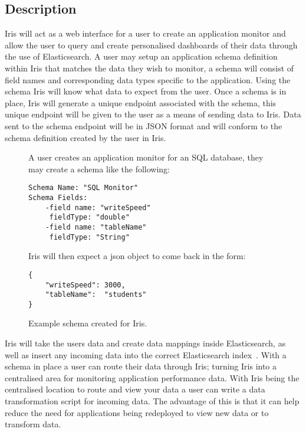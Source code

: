 \documentclass[12pt,a4paper,titlepage]{report}
\begin{document}
\subsection{Description}
Iris will act as a web interface for a user to create an application monitor and allow the user to query and create personalised dashboards of their data through the use of Elasticsearch. A user may setup an application schema definition within Iris that matches the data they wish to monitor, a schema will consist of field names and corresponding data types specific to the application. Using the schema Iris will know what data to expect from the user. Once a schema is in place, Iris will generate a unique endpoint associated with the schema, this unique endpoint will be given to the user as a means of sending data to Iris. Data sent to the schema endpoint will be in JSON format and will conform to the schema definition created by the user in Iris.
\begin{figure}[H]
\begin{tcolorbox}
A user creates an application monitor for an SQL database, they may create a schema like the following:
\begin{verbatim}
Schema Name: "SQL Monitor"
Schema Fields:
    -field name: "writeSpeed"
     fieldType: "double"
    -field name: "tableName"
     fieldType: "String"
\end{verbatim}
Iris will then expect a json object to come back in the form:
\begin{verbatim}
{
	"writeSpeed": 3000,
	"tableName":  "students"
}
\end{verbatim}
\end{tcolorbox}
\caption{Example schema created for Iris.}
\end{figure}

Iris will take the users data and create data mappings \parencite{Elastic.co.Mapping} inside Elasticsearch, as well as insert any incoming data into the correct Elasticsearch index~\parencite{Elastic.co.Basic}. With a schema in place a user can route their data through Iris; turning Iris into a centralised area for monitoring application performance data. With Iris being the centralised location to route and view your data a user can write a data transformation script for incoming data. The advantage of this is that it can help reduce the need for applications being redeployed to view new data or to transform data.
\end{document}
